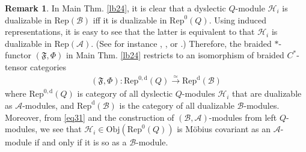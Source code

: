 \documentclass[11pt,b5paper,notitlepage]{article}
\theoremstyle{definition}
\newtheorem{rem}[df]{Remark}
\theoremstyle{plain}
\newcommand{\fk}{\mathfrak}
\newcommand{\mc}{\mathcal}
\newcommand{\Rep}{\mathrm{Rep}}
\newcommand{\RepA}{\mathrm{Rep}(\mathcal A)}
\newcommand{\Obj}{\mathrm{Obj}}
\numberwithin{equation}{section}
\begin{document}
\begin{rem}
In Main Thm. \ref{lb24}, it is clear that a dyslectic $Q$-module $\mc H_i$ is dualizable in $\Rep(\mc B)$ iff it is dualizable in $\Rep^0(Q)$. Using induced representations, it is easy to see that the latter is equivalent to that $\mc H_i$ is dualizable in $\RepA$. (See for instance \cite{KO02}, \cite{NY16}, or \cite[Thm. 3.18]{Gui19}.) Therefore, the braided $*$-functor $(\fk F,\Phi)$ in Main Thm. \ref{lb24} restricts to an isomorphism of braided $C^*$-tensor categories
\begin{align*}
(\fk F,\Phi):\Rep^{0,\mathrm d}(Q)\xrightarrow{\simeq}\Rep^{\mathrm d}(\mc B)
\end{align*}
where $\Rep^{0,\mathrm d}(Q)$ is category of all dyslectic $Q$-modules $\mc H_i$ that are dualizable as $\mc A$-modules, and  $\Rep^{\mathrm d}(\mc B)$ is the  category of all  dualizable $\mc B$-modules. Moreover, from \eqref{eq31} and the construction of $(\mc B,\mc A)$-modules from left $Q$-modules,  we see that $\mc H_i\in\Obj(\Rep^0(Q))$ is M\"obius covariant as an $\mc A$-module if and only if it is so as a $\mc B$-module. 
\end{rem}










	
	
	
	
	

	
\end{document}
